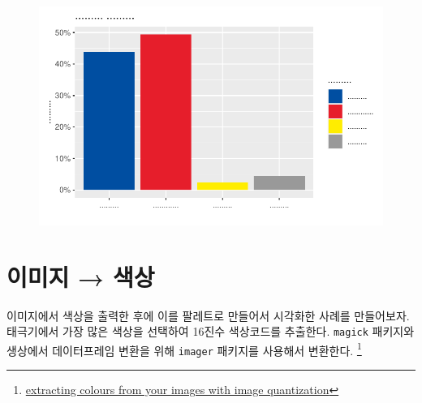\documentclass[
  letterpaper,
]{book}
\begin{document}
\begin{figure}[H]

{\centering \includegraphics{colors_files/figure-pdf/unnamed-chunk-5-1.pdf}

}

\end{figure}

\hypertarget{uxc774uxbbf8uxc9c0-uxc0c9uxc0c1}{%
\section{이미지 → 색상}\label{uxc774uxbbf8uxc9c0-uxc0c9uxc0c1}}

이미지에서 색상을 출력한 후에 이를 팔레트로 만들어서 시각화한 사례를
만들어보자. 태극기에서 가장 많은 색상을 선택하여 16진수 색상코드를
추출한다. \texttt{magick} 패키지와 생상에서 데이터프레임 변환을 위해
\texttt{imager} 패키지를 사용해서 변환한다. \footnote{\href{https://chichacha.netlify.app/2019/01/19/extracting-colours-from-your-images-with-image-quantization/}{extracting
  colours from your images with image quantization}}
\end{document}
